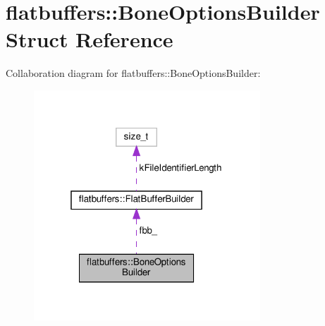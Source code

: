 \hypertarget{structflatbuffers_1_1BoneOptionsBuilder}{}\section{flatbuffers\+:\+:Bone\+Options\+Builder Struct Reference}
\label{structflatbuffers_1_1BoneOptionsBuilder}


Collaboration diagram for flatbuffers\+:\+:Bone\+Options\+Builder\+:
\nopagebreak
\begin{figure}[H]
\begin{center}
\leavevmode
\includegraphics[width=241pt]{structflatbuffers_1_1BoneOptionsBuilder__coll__graph}
\end{center}
\end{figure}
